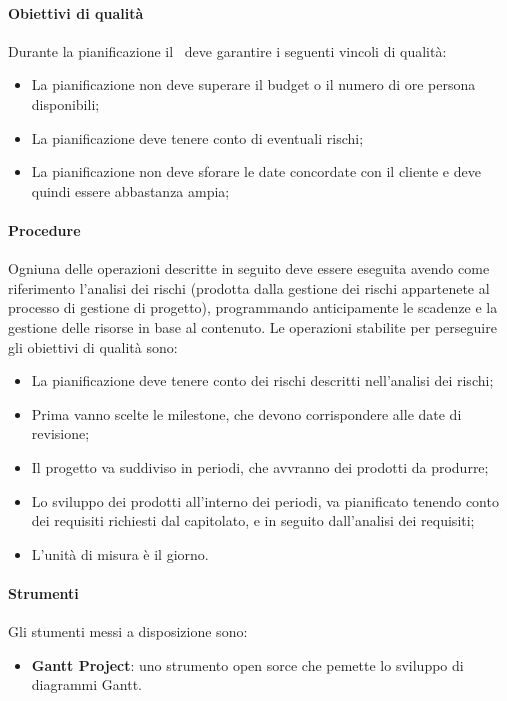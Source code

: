 \documentclass[../NormeDiProgetto_v3.0.0.tex]{subfiles}
\begin{document}
			\paragraph{Obiettivi di qualità}
				Durante la pianificazione il \responsabilediprogetto\ deve garantire i seguenti vincoli di qualità: 
				\begin{itemize}
					\item La pianificazione non deve superare il budget o il numero di ore persona disponibili;
					\item La pianificazione deve tenere conto di eventuali rischi;
					\item La pianificazione non deve sforare le date concordate con il cliente e deve quindi essere abbastanza ampia;
				\end{itemize}
	
			\paragraph{Procedure}
				Ogniuna delle operazioni descritte in seguito deve essere eseguita avendo come riferimento l'analisi dei rischi (prodotta dalla gestione dei rischi appartenete al processo di gestione di progetto), programmando anticipamente le scadenze e la gestione delle risorse in base al contenuto.
				Le operazioni stabilite per perseguire gli obiettivi di qualità sono:
				\begin{itemize}
					\item La pianificazione deve tenere conto dei rischi descritti nell'analisi dei rischi;
					\item Prima vanno scelte le milestone, che devono corrispondere alle date di revisione;
					\item Il progetto va suddiviso in periodi, che avvranno dei prodotti da produrre;
					\item Lo sviluppo dei prodotti all'interno dei periodi, va pianificato tenendo conto dei requisiti richiesti dal capitolato, e in seguito dall'analisi dei requisiti;
					\item L'unità di misura è il giorno.
				\end{itemize}

			\paragraph{Strumenti}
				Gli stumenti messi a disposizione sono:
				\begin{itemize}
					\item \textbf{Gantt Project}: uno strumento open sorce che pemette lo sviluppo di diagrammi Gantt.
				\end{itemize}
\end{document}
